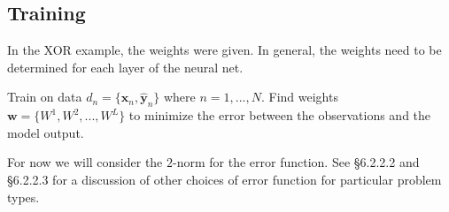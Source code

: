 \documentclass[12pt,letterpaper,noanswers]{exam}
\newcommand{\vc}[1]{\boldsymbol{#1}}
\begin{document}
\subsection*{Training}
In the XOR example, the weights were given.  In general, the weights need to be determined for each layer of the neural net.
\begin{tcolorbox}
Train on data $d_n = \{\vc{x}_n,\hat{\vc{y}}_n\}$ where $n=1,...,N$.  Find weights $\vc{w} = \{W^1,W^2,...,W^L\}$ to minimize the error between the observations and the model output.

For now we will consider the $2$-norm for the error function.  See \cite{Goodfellow-et-al-2016} \S 6.2.2.2 and \S 6.2.2.3 for a discussion of other choices of error function for particular problem types.
\end{tcolorbox}









\end{document}

